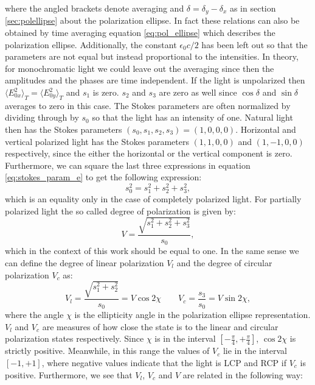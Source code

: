 where the angled brackets denote averaging and $\delta=\delta_y-\delta_x$ as in section \ref{sec:polellipse} about the polarization ellipse. In fact these relations can also be obtained by time averaging equation \ref{eq:pol_ellipse} which describes the polarization ellipse. Additionally, the constant $\epsilon_0 c / 2$ has been left out so that the parameters are not equal but instead proportional to the intensities. In theory, for monochromatic light we could leave out the averaging since then the amplitudes and the phases are time independent. If the light is unpolarized then $\langle E_{0x}^2 \rangle_T = \langle E_{0y}^2 \rangle_T$ and $s_1$ is zero. $s_2$ and $s_3$ are zero as well since $\cos \delta$ and $\sin \delta$ averages to zero in this case. The Stokes parameters are often normalized by dividing through by $s_0$ so that the light has an intensity of one. Natural light then has the Stokes parameters $(s_0,s_1,s_2,s_3)=(1,0,0,0)$. Horizontal and vertical polarized light has the Stokes parameters $(1,1,0,0)$ and $(1,-1,0,0)$ respectively, since the either the horizontal or the vertical component is zero. Furthermore, we can square the last three expressions in equation \ref{eq:stokes_param_e} to get the following expression:
\begin{equation}
    \label{eq:stokes_char_eq}
    s_0^2 = s_1^2 + s_2^2 + s_3^2,
\end{equation}
which is an equality only in the case of completely polarized light. For partially polarized light the so called degree of polarization is given by:
\begin{equation}
    V = \frac{\sqrt{s_1^2 + s_2^2 + s_3^2}}{s_0},
\end{equation}
which in the context of this work should be equal to one. In the same sense we can define the degree of linear polarization $V_l$ and the degree of circular polarization $V_c$ as:
\begin{equation}
    V_l = \frac{\sqrt{s_1^2+s_2^2}}{s_0} = V \cos 2\chi \qquad V_c = \frac{s_3}{s_0} = V \sin 2\chi,
\end{equation}
where the angle $\chi$ is the ellipticity angle in the polarization ellipse representation. $V_l$ and $V_c$ are measures of how close the state is to the linear and circular polarization states respectively. Since $\chi$ is in the interval $\left[-\frac{\pi}{4}, +\frac{\pi}{4}\right]$, $\cos 2\chi$ is strictly positive. Meanwhile, in this range the values of $V_c$ lie in the interval $\left[-1, +1\right]$, where negative values indicate that the light is LCP and RCP if $V_c$ is positive. Furthermore, we see that $V_l$, $V_c$ and $V$ are related in the following way:

